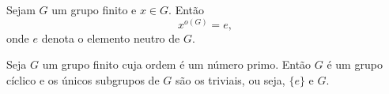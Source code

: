 \documentclass{beamer}
\begin{document}
    \begin{frame}
        \begin{corolario}
            Sejam $G$ um grupo finito e $x \in G$. Então
            \[
                x^{o(G)} = e,
            \]
            onde $e$ denota o elemento neutro de $G$.
        \end{corolario}
    \end{frame}

    \begin{frame}
        \begin{corolario}
            Seja $G$ um grupo finito cuja ordem é um número primo. Então $G$ é um grupo cíclico e os únicos subgrupos de $G$ são os triviais, ou seja, $\{e\}$ e $G$.
        \end{corolario}
    \end{frame}
\end{document}
